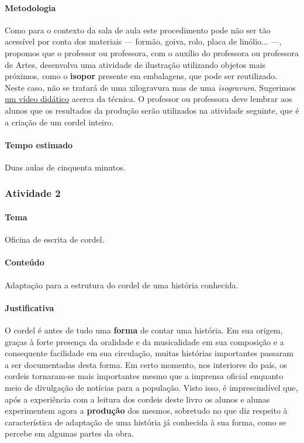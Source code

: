 \documentclass[11pt]{extarticle}
\begin{document}

\paragraph{Metodologia} Como para o contexto da sala de aula este procedimento pode não ser tão
acessível por conta dos materiais --- formão, goiva, rolo, placa de linólio... ---,
propomos que o professor ou professora, com o auxílio do professora ou professora
de Artes, desenvolva uma atividade de ilustração utilizando objetos mais 
próximos, como o \textbf{isopor} presente em embalagens, que pode ser reutilizado.
Neste caso, não se tratará de uma xilogravura mas de uma \textit{isogravura}.
Sugerimos \href{https://www.youtube.com/watch?v=8sq9Qq-wrls}{um vídeo didático}
acerca da técnica. O professor ou
professora deve lembrar aos alunos que os resultados da produção serão utilizados
na atividade seguinte, que é a criação de um cordel inteiro. 


\paragraph{Tempo estimado} Duas aulas de cinquenta minutos.


\subsubsection{Atividade 2}


\paragraph{Tema} Oficina de escrita de cordel.


\paragraph{Conteúdo} Adaptação para a estrutura do cordel
de uma história conhecida.

\paragraph{Justificativa} O cordel é antes de tudo uma \textbf{forma} 
de contar uma história. Em sua origem, graças à forte presença
da oralidade e da musicalidade em sua composição e a consequente
facilidade em sua circulação, muitas histórias importantes passaram
a ser documentadas desta forma. Em certo momento, nos interiores 
do país, os cordeis tornaram-se mais importantes mesmo que a imprensa
oficial enquanto meio de divulgação de notícias para a população. 
Visto isso, é imprescindível que, após a experiência com a leitura dos
cordeis deste livro os alunos e alunas experimentem agora a \textbf{produção}
dos mesmos, sobretudo no que diz respeito à característica de adaptação 
de uma história já conhecida à sua forma, como se percebe em algumas
partes da obra.
\end{document}
